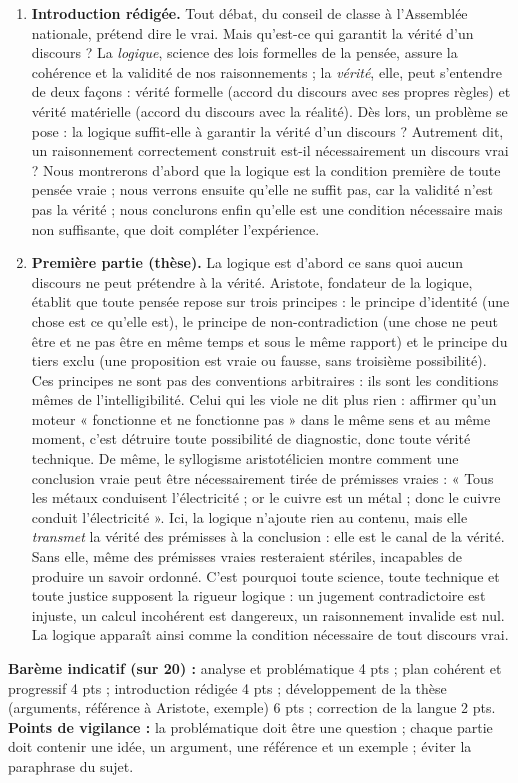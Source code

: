 \documentclass[11pt]{article}
\begin{document}
\begin{corrige}
\begin{enumerate}
    \item \textbf{Introduction rédigée.} Tout débat, du conseil de classe à l'Assemblée nationale, prétend dire le vrai. Mais qu'est-ce qui garantit la vérité d'un discours ? La \emph{logique}, science des lois formelles de la pensée, assure la cohérence et la validité de nos raisonnements ; la \emph{vérité}, elle, peut s'entendre de deux façons : vérité formelle (accord du discours avec ses propres règles) et vérité matérielle (accord du discours avec la réalité). Dès lors, un problème se pose : la logique suffit-elle à garantir la vérité d'un discours ? Autrement dit, un raisonnement correctement construit est-il nécessairement un discours vrai ? Nous montrerons d'abord que la logique est la condition première de toute pensée vraie ; nous verrons ensuite qu'elle ne suffit pas, car la validité n'est pas la vérité ; nous conclurons enfin qu'elle est une condition nécessaire mais non suffisante, que doit compléter l'expérience.
    \item \textbf{Première partie (thèse).} La logique est d'abord ce sans quoi aucun discours ne peut prétendre à la vérité. Aristote, fondateur de la logique, établit que toute pensée repose sur trois principes : le principe d'identité (une chose est ce qu'elle est), le principe de non-contradiction (une chose ne peut être et ne pas être en même temps et sous le même rapport) et le principe du tiers exclu (une proposition est vraie ou fausse, sans troisième possibilité). Ces principes ne sont pas des conventions arbitraires : ils sont les conditions mêmes de l'intelligibilité. Celui qui les viole ne dit plus rien : affirmer qu'un moteur « fonctionne et ne fonctionne pas » dans le même sens et au même moment, c'est détruire toute possibilité de diagnostic, donc toute vérité technique. De même, le syllogisme aristotélicien montre comment une conclusion vraie peut être nécessairement tirée de prémisses vraies : « Tous les métaux conduisent l'électricité ; or le cuivre est un métal ; donc le cuivre conduit l'électricité ». Ici, la logique n'ajoute rien au contenu, mais elle \emph{transmet} la vérité des prémisses à la conclusion : elle est le canal de la vérité. Sans elle, même des prémisses vraies resteraient stériles, incapables de produire un savoir ordonné. C'est pourquoi toute science, toute technique et toute justice supposent la rigueur logique : un jugement contradictoire est injuste, un calcul incohérent est dangereux, un raisonnement invalide est nul. La logique apparaît ainsi comme la condition nécessaire de tout discours vrai.
\end{enumerate}
\textbf{Barème indicatif (sur 20) :} analyse et problématique 4 pts ; plan cohérent et progressif 4 pts ; introduction rédigée 4 pts ; développement de la thèse (arguments, référence à Aristote, exemple) 6 pts ; correction de la langue 2 pts. \textbf{Points de vigilance :} la problématique doit être une question ; chaque partie doit contenir une idée, un argument, une référence et un exemple ; éviter la paraphrase du sujet.
\end{corrige}
\end{document}

